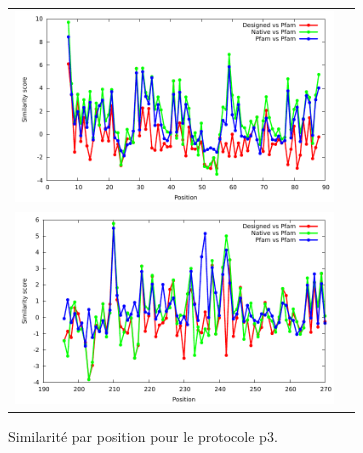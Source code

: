 \documentclass[a4paper,12pt]{article}
\begin{document}
\begin{figure}[t]
\begin{tabular}{cc}
       \includegraphics[width=8.45cm]{images/1O4C_p3_similarity_bypos.pdf} \\
       \includegraphics[width=8.45cm]{images/1R6J_p3_similarity_bypos.pdf} \\
     \end{tabular}
     
     \caption{Similarité par position pour le protocole p3.}
     \label{Sim_pos_byp3}
   \end{figure}
\end{document}
